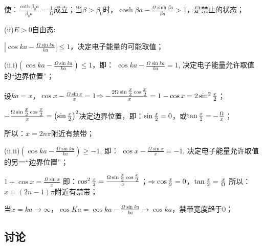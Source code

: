 使：$\frac{{\coth \beta _0 a}}{{\beta _0 a}} = \frac{1}{\Omega }$成立；当$\beta  > \beta _0 $时，$\cosh \beta a - \frac{{\Omega \sinh \beta a}}{{\beta a}} > 1$，是禁止的状态；

(ii)$E > 0$自由态:

$\left| {\cos ka - \frac{{\Omega \sin ka}}{{ka}}} \right| \le 1$，决定电子能量的可能取值；

(ii.i)$\left( {\cos ka - \frac{{\Omega \sin ka}}{{ka}}} \right) \le 1$，即：
$\cos ka - \frac{{\Omega \sin ka}}{{ka}} = 1$,
决定电子能量允许取值的``边界位置''；


设$ka = x$，$\cos x - \frac{{\Omega \sin x}}{x} = 1$$ \Rightarrow  - \frac{{2\Omega \sin {\textstyle{x \over 2}}\cos {\textstyle{x \over 2}}}}{x} = 1 - \cos x = 2\sin ^2 {\textstyle{x \over 2}}$；


$ - \frac{{\Omega \sin {\textstyle{x \over 2}}\cos {\textstyle{x \over 2}}}}{x} = \left( {\sin {\textstyle{x \over 2}}} \right)^2 $决定边界位置，即：$\sin {\textstyle{x \over 2}} = 0$，或$\tan {\textstyle{x \over 2}} =  - {\textstyle{\Omega  \over x}}$；

所以：$x = 2n\pi $附近有禁带；

(ii.ii)$\left( {\cos ka - \frac{{\Omega \sin ka}}{{ka}}} \right) \ge  - 1$, 即：
$\cos x - \frac{{\Omega \sin x}}{x} =  - 1$,
决定电子能量允许取值的另一``边界位置''；

$1 + \cos x = \frac{{\Omega \sin x}}{x}$
即：$\cos ^2 {\textstyle{x \over 2}} = \frac{{\Omega \sin {\textstyle{x \over 2}}\cos {\textstyle{x \over 2}}}}{x}$；$ \Rightarrow \cos {\textstyle{x \over 2}} = 0$，$\tan {\textstyle{x \over 2}} = {\textstyle{x \over \Omega }}$
所以：$x = (2n - 1)\pi $附近有禁带；

当$x = ka \to \infty $，$\cos Ka = \cos ka - \frac{{\Omega \sin ka}}{{ka}} \to \cos ka$，禁带宽度趋于0；


\subsection*{讨论}


